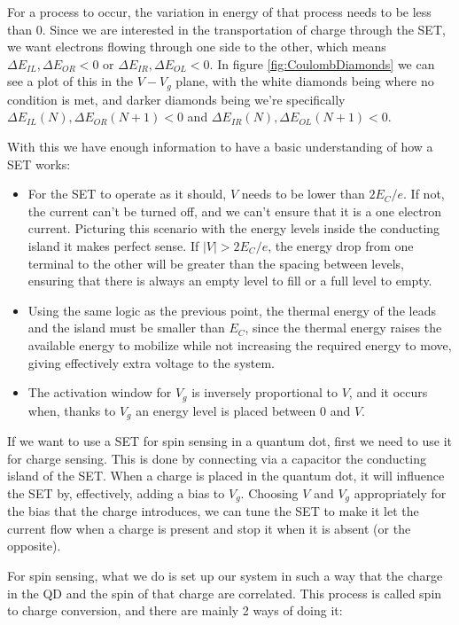 \documentclass[../main.tex]{subfiles}
\begin{document}
For a process to occur, the variation in energy of that process needs to be
less than \(0\). Since we are interested in the transportation of charge
through the SET, we want electrons flowing through one side to the other,
which means \(\Delta E_{IL}, \Delta E_{OR} < 0\) or
\(\Delta E_{IR}, \Delta E_{OL} < 0\). In figure \ref{fig:CoulombDiamonds}
we can see a plot of this in the \(V-V_{g}\) plane, with the white
diamonds being where no condition is met, and darker diamonds
being we're specifically \(\Delta E_{IL}(N), \Delta E_{OR}(N+1) < 0\) and
\(\Delta E_{IR}(N), \Delta E_{OL}(N+1) < 0\).

With this we have enough information to have a basic understanding of how a
SET works:
\begin{itemize}
    \item For the SET to operate as it should, \(V\) needs to be lower than
        \(2E_{C}/e\). If not, the current can't be turned off, and we can't
        ensure that it is a one electron current. Picturing this scenario
        with the energy levels inside the conducting island it makes perfect
        sense. If \(|V| > 2E_{C}/e\), the energy drop from one terminal to the
        other will be greater than the spacing between levels, ensuring
        that there is always an empty level to fill or a full level to empty.
    \item Using the same logic as the previous point, the thermal energy of
        the leads and the island must be smaller than \(E_{C}\), since
        the thermal energy raises the available energy to mobilize while
        not increasing the required energy to move, giving effectively
        extra voltage to the system.
    \item The activation window for \(V_{g}\) is inversely proportional to
        \(V\), and it occurs when, thanks to \(V_{g}\) an energy level
        is placed between \(0\) and \(V\).
\end{itemize}

If we want to use a SET for spin sensing in a quantum dot, first we need to
use it for charge sensing. This is done by connecting via a capacitor the
conducting island of the SET. When a charge is placed in the quantum dot, it
will influence the SET by, effectively, adding a bias to \(V_{g}\). Choosing
\(V\) and \(V_{g}\) appropriately for the bias that the charge introduces, we
can tune the SET to make it let the current flow when a charge is present
and stop it when it is absent (or the opposite).

For spin sensing, what we do is set up our system in such a way that the charge
in the QD and the spin of that charge are correlated. This process is called
spin to charge conversion, and there are mainly 2 ways of doing it:
\end{document}
